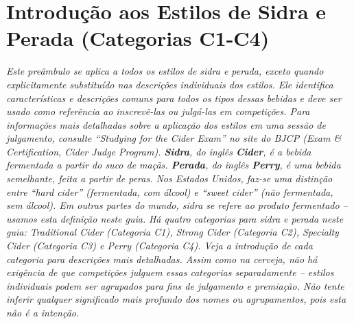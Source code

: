 \section*{Introdução aos Estilos de Sidra e Perada (Categorias C1-C4)}
\textit{Este preâmbulo se aplica a todos os estilos de sidra e perada, exceto quando explicitamente substituído nas descrições individuais dos estilos. Ele identifica características e descrições comuns para todos os tipos dessas bebidas e deve ser usado como referência ao inscrevê-las ou julgá-las em competições. Para informações mais detalhadas sobre a aplicação dos estilos em uma sessão de julgamento, consulte “Studying for the Cider Exam” no site do BJCP (Exam & Certification, Cider Judge Program).}
 \textit{\textbf{Sidra}, do inglês \textbf{Cider}, é a bebida fermentada a partir do suco de maçãs. \textbf{Perada}, do inglês \textbf{Perry}, é uma bebida semelhante, feita a partir de peras. Nos Estados Unidos, faz-se uma distinção entre “hard cider”  (fermentada, com álcool) e “sweet cider”  (não fermentada, sem álcool). Em outras partes do mundo, sidra se refere ao produto fermentado – usamos esta definição neste guia.} 
 \textit{Há quatro categorias para sidra e perada neste guia: Traditional Cider (Categoria C1), Strong Cider (Categoria C2), Specialty Cider (Categoria C3) e Perry (Categoria C4). Veja a introdução de cada categoria para descrições mais detalhadas. Assim como na cerveja, não há exigência de que competições julguem essas categorias separadamente – estilos individuais podem ser agrupados para fins de julgamento e premiação. Não tente inferir qualquer significado mais profundo dos nomes ou agrupamentos, pois esta não é a intenção.}
